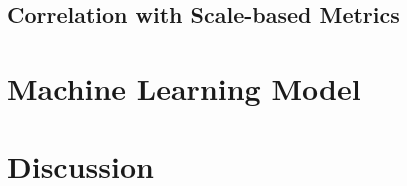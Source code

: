\subsection{Correlation with Scale-based Metrics}
\label{subsec:correlation}
\section{Machine Learning Model}
\label{sec:machineLearning}

\section{Discussion}
\label{sec:discussion}

